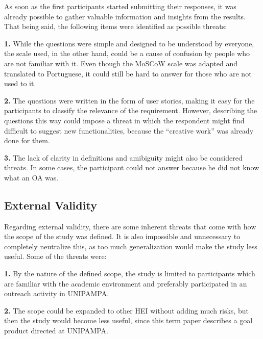 As soon as the first participants started submitting their responses, it was already possible to gather valuable information and insights from the results. That being said, the following items were identified as possible threats:
\begin{description}
  \item \textbf{1.} While the questions were simple and designed to be understood by everyone, the scale used, in the other hand, could be a cause of confusion by people who are not familiar with it. Even though the MoSCoW scale was adapted and translated to Portuguese, it could still be hard to answer for those who are not used to it.
  \item \textbf{2.} The questions were written in the form of user stories, making it easy for the participants to classify the relevance of the requirement. However, describing the questions this way could impose a threat in which the respondent might find difficult to suggest new functionalities, because the ``creative work'' was already done for them.
  \item \textbf{3.} The lack of clarity in definitions and amibiguity might also be considered threats. In some cases, the participant could not answer because he did not know what an \ac{OA} was.
\end{description}

\subsection{External Validity}\label{sec:survey-external-validity}

Regarding external validity, there are some inherent threats that come with how the scope of the study was defined. It is also impossible and unnecessary to completely neutralize this, as too much generalization would make the study less useful. Some of the threats were:
\begin{description}
  \item \textbf{1.} By the nature of the defined scope, the study is limited to participants which are familiar with the academic environment and preferably participated in an outreach activity in \ac{UNIPAMPA}.
  \item \textbf{2.} The scope could be expanded to other \ac{HEI} without adding much risks, but then the study would become less useful, since this term paper describes a goal product directed at \ac{UNIPAMPA}.
\end{description}

